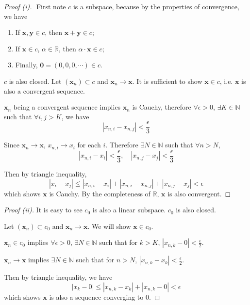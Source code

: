 \documentclass[11pt,a4paper]{amsart}
\def\R{{\mathbb R}}
\def\N{{\mathbb N}}
\def\a{\alpha}
\def\e{\epsilon}
\begin{document}
\begin{proof}[Proof (i)]$ $
First note $c$ is a subspace, because by the properties of convergence, we have
\begin{enumerate}
  \item If $\bm x, \bm y \in c$, then $\bm x + \bm y \in c$;
  \item If $\bm x\in c$, $\a\in\R$, then $\a\cdot\bm x \in c$;
  \item Finally, $\bm 0 = (0,0,0,\cdots) \in c$.
\end{enumerate}

$c$ is also closed. Let $(\bm x_n)\subset c$ and $\bm x_n \to \bm x$.
It is sufficient to show $\bm x \in c$, i.e. $\bm x$ is also a convergent sequence.

$\bm x_n$ being a convergent sequence implies $\bm x_n$ is Cauchy, therefore
$\forall\e>0$, $\exists K\in\N$ such that $\forall i,j>K$, we have
$$ |x_{n,i} - x_{n,j}| < \frac{\e}{3} $$

Since $\bm x_n \to \bm x$, $x_{n,i}\to x_i$ for each $i$.
Therefore $\exists N\in\N$ such that $\forall n>N$,
$$ |x_{n,i} - x_i| < \frac{\e}{3}, \quad |x_{n,j} - x_j| < \frac{\e}{3} $$

Then by triangle inequality,
$$ |x_i - x_j| \le |x_{n,i} - x_i| + |x_{n,i} - x_{n,j}| + |x_{n,j} - x_j| < \e $$
which shows $\bm x$ is Cauchy. By the completeness of $\R$, $\bm x$ is also convergent.
\end{proof}

\begin{proof}[Proof (ii)]
It is easy to see $c_0$ is also a linear subspace. $c_0$ is also closed.

Let $(\bm x_n) \subset c_0$ and $\bm x_n \to \bm x$. We will show $\bm x\in c_0$.

$\bm x_n \in c_0$ implies $\forall\e>0$, $\exists N\in\N$ such that
for $k>K$, $|x_{n,k} - 0| < \frac{\e}{2}$.

$\bm x_n \to \bm x$ implies $\exists N\in\N$ such that for $n>N$,
$|x_{n,k} - x_k| < \frac{\e}{2}$.

Then by triangle inequality, we have
$$ |x_k - 0| \le |x_{n,k} - x_k| + |x_{n,k} - 0| < \e $$
which shows $\bm x$ is also a sequence converging to $0$.
\end{proof}
\end{document}
